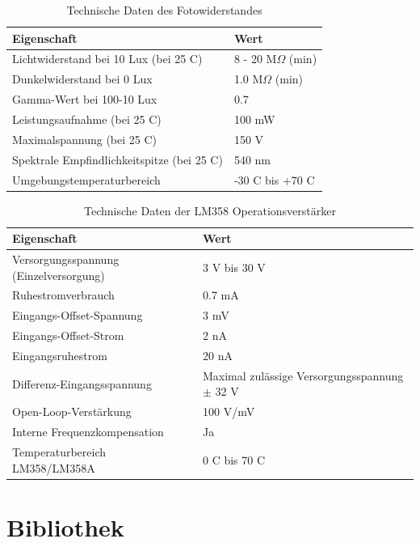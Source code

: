 \begin{table}[h!]
	\centering
	\begin{tabular}{|l|l|}
		\hline
		\textbf{Eigenschaft} & \textbf{Wert} \\
		\hline
		Lichtwiderstand bei 10 Lux (bei 25 C) & 8 - 20 M$\Omega$ (min) \\	%
		\hline
		Dunkelwiderstand bei 0 Lux & 1.0 M$\Omega$ (min) \\
		\hline
		Gamma-Wert bei 100-10 Lux & 0.7 \\
		\hline
		Leistungsaufnahme (bei 25 C) & 100 mW \\
		\hline
		Maximalspannung (bei 25 C) & 150 V \\
		\hline
		Spektrale Empfindlichkeitspitze (bei 25 C) & 540 nm \\
		\hline
		Umgebungstemperaturbereich & -30 C bis +70 C \\
		\hline
	\end{tabular}
	\caption{Technische Daten des Fotowiderstandes  }	%
\end{table}

\begin{table}[h]
	\centering
	\renewcommand{\arraystretch}{1.3}
	\begin{tabular}{|l|l|}
		\hline
		\textbf{Eigenschaft} & \textbf{Wert} \\
		\hline
		Versorgungsspannung (Einzelversorgung) & 3 V bis 30 V \\
		\hline
		Ruhestromverbrauch & 0.7 mA \\
		\hline
		Eingangs-Offset-Spannung & 3 mV \\
		\hline
		Eingangs-Offset-Strom & 2 nA  \\
		\hline
		Eingangsruhestrom & 20 nA  \\
		\hline
		Differenz-Eingangsspannung & Maximal zulässige Versorgungsspannung $\pm$ 32 V \\
		\hline
		Open-Loop-Verstärkung & 100 V/mV  \\
		\hline
		Interne Frequenzkompensation & Ja \\
		\hline
		Temperaturbereich LM358/LM358A & 0 C bis 70 C \\
		\hline
	\end{tabular}
	\caption{Technische Daten der LM358 Operationsverstärker} 	%
\end{table}

\section{Bibliothek}

